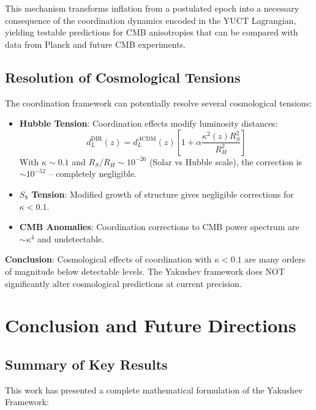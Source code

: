 \documentclass[11pt,a4paper]{article}
\begin{document}
	This mechanism transforms inflation from a postulated epoch into a necessary consequence of the coordination dynamics encoded in the YUCT Lagrangian, yielding testable predictions for CMB anisotropies that can be compared with data from Planck and future CMB experiments.
	
	\subsection{Resolution of Cosmological Tensions}
	
	The coordination framework can potentially resolve several cosmological tensions:
	
	\begin{itemize}
		\item \textbf{Hubble Tension}: Coordination effects modify luminosity distances:
		\begin{equation}
			d_L^{\text{DIR}}(z) = d_L^{\Lambda\text{CDM}}(z) \left[ 1 + \alpha \frac{\kappa^2(z) R_S^2}{R_H^2} \right]
		\end{equation}
		With $\kappa \sim 0.1$ and $R_S/R_H \sim 10^{-26}$ (Solar vs Hubble scale), the correction is $\sim 10^{-52}$ -- completely negligible.
		
		\item \textbf{$S_8$ Tension}: Modified growth of structure gives negligible corrections for $\kappa < 0.1$.
		
		\item \textbf{CMB Anomalies}: Coordination corrections to CMB power spectrum are $\sim \kappa^4$ and undetectable.
	\end{itemize}
	
	\textbf{Conclusion}: Cosmological effects of coordination with $\kappa < 0.1$ are many orders of magnitude below detectable levels. The Yakushev framework does NOT significantly alter cosmological predictions at current precision.
	
	\section{Conclusion and Future Directions}
	\subsection{Summary of Key Results}
	
	This work has presented a complete mathematical formulation of the Yakushev Framework:
	
\end{document}
